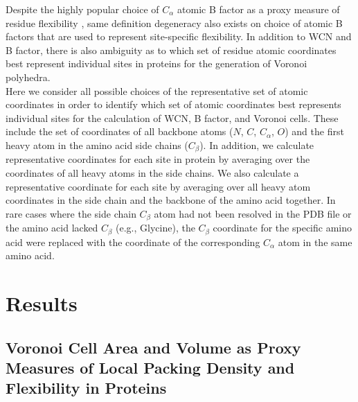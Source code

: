 \documentclass[11pt]{article}
\begin{document}
        Despite the highly popular choice of $C_\alpha$ atomic B factor as a proxy measure of residue flexibility \citep[e.g.,][]{halle_flexibility_2002}, same definition degeneracy also exists on choice of atomic B factors that are used to represent site-specific flexibility. In addition to WCN and B factor, there is also ambiguity as to which set of residue atomic coordinates best represent individual sites in proteins for the generation of Voronoi polyhedra. \\

         Here we consider all possible choices of the representative set of atomic coordinates in order to identify which set of atomic coordinates best represents individual sites for the calculation of WCN, B factor, and Voronoi cells. These include the set of coordinates of all backbone atoms ($N$, $C$, $C_\alpha$, $O$) and the first heavy atom in the amino acid side chains ($C_\beta$). In addition, we calculate representative coordinates for each site in protein by averaging over the coordinates of all heavy atoms in the side chains. We also calculate a representative coordinate for each site by averaging over all heavy atom coordinates in the side chain and the backbone of the amino acid together. In rare cases where the side chain $C_\beta$ atom had not been resolved in the PDB file or the amino acid lacked $C_\beta$ (e.g., Glycine), the $C_\beta$ coordinate for the specific amino acid were replaced with the coordinate of the corresponding $C_\alpha$ atom in the same amino acid. \\


\section{Results}
\label{sec:results}

    \subsection*{Voronoi Cell Area and Volume as Proxy Measures of Local Packing Density and Flexibility in Proteins}
\end{document}

